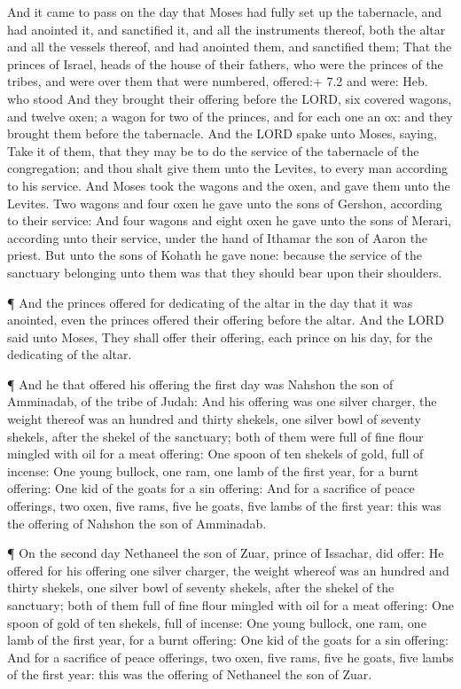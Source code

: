  And it came to pass on the day that Moses had fully set up
the tabernacle, and had anointed it, and sanctified it, and all the
instruments thereof, both the altar and all the vessels thereof, and had
anointed them, and sanctified them;  That the princes of
Israel, heads of the house of their fathers, who were the princes of the
tribes, and were over them that were numbered, offered:+ 7.2 and were:
Heb. who stood  And they brought their offering before the
LORD, six covered wagons, and twelve oxen; a wagon for two of the
princes, and for each one an ox: and they brought them before the
tabernacle.  And the LORD spake unto Moses, saying,
 Take it of them, that they may be to do the service of the
tabernacle of the congregation; and thou shalt give them unto the
Levites, to every man according to his service.  And Moses
took the wagons and the oxen, and gave them unto the Levites.
 Two wagons and four oxen he gave unto the sons of Gershon,
according to their service:  And four wagons and eight oxen
he gave unto the sons of Merari, according unto their service, under the
hand of Ithamar the son of Aaron the priest.  But unto the
sons of Kohath he gave none: because the service of the sanctuary
belonging unto them was that they should bear upon their shoulders.

 ¶ And the princes offered for dedicating of the altar in
the day that it was anointed, even the princes offered their offering
before the altar.  And the LORD said unto Moses, They shall
offer their offering, each prince on his day, for the dedicating of the
altar.

 ¶ And he that offered his offering the first day was
Nahshon the son of Amminadab, of the tribe of Judah:  And
his offering was one silver charger, the weight thereof was an hundred
and thirty shekels, one silver bowl of seventy shekels, after the shekel
of the sanctuary; both of them were full of fine flour mingled with oil
for a meat offering:  One spoon of ten shekels of gold,
full of incense:  One young bullock, one ram, one lamb of
the first year, for a burnt offering:  One kid of the goats
for a sin offering:  And for a sacrifice of peace
offerings, two oxen, five rams, five he goats, five lambs of the first
year: this was the offering of Nahshon the son of Amminadab.

 ¶ On the second day Nethaneel the son of Zuar, prince of
Issachar, did offer:  He offered for his offering one
silver charger, the weight whereof was an hundred and thirty shekels,
one silver bowl of seventy shekels, after the shekel of the sanctuary;
both of them full of fine flour mingled with oil for a meat offering:
 One spoon of gold of ten shekels, full of incense:
 One young bullock, one ram, one lamb of the first year,
for a burnt offering:  One kid of the goats for a sin
offering:  And for a sacrifice of peace offerings, two
oxen, five rams, five he goats, five lambs of the first year: this was
the offering of Nethaneel the son of Zuar.

